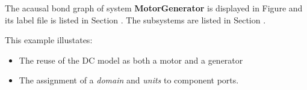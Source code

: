 

   The acausal bond graph of system \textbf{MotorGenerator} is
   displayed in Figure  and its label
   file is listed in Section .
   The subsystems are listed in Section .

This example illustates:
\begin{itemize}
\item The reuse of the DC model as both a motor and a generator
\item The assignment of a \emph{domain} and \emph{units} to component ports.
\end{itemize}

